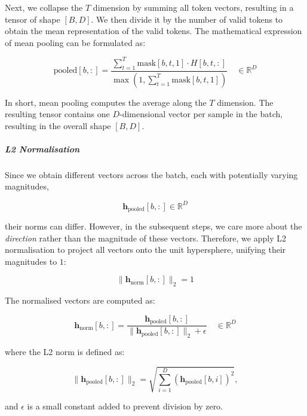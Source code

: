\documentclass[12pt]{article}
\begin{document}
Next, we collapse the $T$ dimension by summing all token vectors, resulting in a tensor of shape $[B, D]$. 
We then divide it by the number of valid tokens to obtain the mean representation of the valid tokens. 
The mathematical expression of mean pooling can be formulated as:

\begin{equation}
\text{pooled}[b, :] = 
\frac{\displaystyle \sum_{t=1}^{T} \text{mask}[b, t, 1] \cdot H[b, t, :]}
{\displaystyle \max \!\left( 1, \sum_{t=1}^{T} \text{mask}[b, t, 1] \right)}
\quad \in \mathbb{R}^{D}
\end{equation}

In short, mean pooling computes the average along the $T$ dimension. 
The resulting tensor contains one $D$-dimensional vector per sample in the batch, resulting in the overall shape $[B, D]$.

\subparagraph{L2 Normalisation}
Since we obtain different vectors across the batch, each with potentially varying magnitudes,

\begin{equation}
\mathbf{h}_{\text{pooled}}[b, :] \in \mathbb{R}^{D}
\end{equation}

\noindent their norms can differ. 
However, in the subsequent steps, we care more about the \textit{direction} rather than the magnitude of these vectors. 
Therefore, we apply L2 normalisation to project all vectors onto the unit hypersphere, unifying their magnitudes to $1$:

\begin{equation}
\|\mathbf{h}_{\text{norm}}[b, :]\|_2 = 1
\end{equation}

\noindent The normalised vectors are computed as:

\begin{equation}
\mathbf{h}_{\text{norm}}[b, :] =
\frac{\mathbf{h}_{\text{pooled}}[b, :]}
{\|\mathbf{h}_{\text{pooled}}[b, :]\|_2 + \epsilon}
\quad \in \mathbb{R}^{D}
\end{equation}

\noindent where the L2 norm is defined as:

\begin{equation}
\|\mathbf{h}_{\text{pooled}}[b, :]\|_2
= \sqrt{\sum_{i=1}^{D} \left(\mathbf{h}_{\text{pooled}}[b, i]\right)^2},
\end{equation}

\noindent and $\epsilon$ is a small constant added to prevent division by zero.
\end{document}
